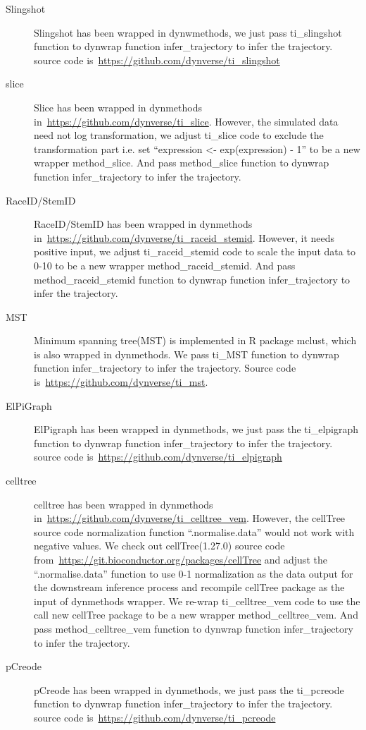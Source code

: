 \begin{description}
	\item[Slingshot]
	Slingshot has been wrapped in dynwmethods, we just pass ti\_slingshot function to dynwrap function infer\_trajectory to infer the trajectory. source code is~\url{https://github.com/dynverse/ti\_slingshot}

	\item[slice]
	Slice has been wrapped in dynmethods in~\url{https://github.com/dynverse/ti\_slice}. However, the simulated data need not log transformation, we adjust ti\_slice code to exclude the transformation part i.e. set ``expression <- exp(expression) - 1'' to be a new wrapper method\_slice. And pass method\_slice function to dynwrap function infer\_trajectory to infer the trajectory.

	\item[RaceID/StemID]
	RaceID/StemID has been wrapped in dynmethods in~\url{https://github.com/dynverse/ti\_raceid\_stemid}. However, it needs positive input, we adjust ti\_raceid\_stemid code to scale the input data to 0-10 to be a new wrapper method\_raceid\_stemid. And pass method\_raceid\_stemid function to dynwrap function infer\_trajectory to infer the trajectory.

	\item[MST] 
	Minimum spanning tree(MST) is implemented in R package mclust, which is also wrapped in dynmethods. We pass ti\_MST function to dynwrap function infer\_trajectory to infer the trajectory. Source code is~\url{https://github.com/dynverse/ti\_mst}.

	\item[ElPiGraph] 
	ElPigraph has been wrapped in dynmethods, we just pass the ti\_elpigraph function to dynwrap function infer\_trajectory to infer the trajectory. source code is~\url{https://github.com/dynverse/ti_elpigraph}

	\item[celltree] 
	celltree has been wrapped in dynmethods in~\url{https://github.com/dynverse/ti\_celltree\_vem}. However, the cellTree source code normalization function ``.normalise.data'' would not work with negative values. We check out cellTree(1.27.0) source code from~\url{https://git.bioconductor.org/packages/cellTree} and adjust the ``.normalise.data'' function to use 0-1 normalization as the data output for the downstream inference process and recompile cellTree package as the input of dynmethods wrapper. We re-wrap ti\_celltree\_vem code to use the call new cellTree package to be a new wrapper method\_celltree\_vem. And pass method\_celltree\_vem function to dynwrap function infer\_trajectory to infer the trajectory.

	\item[pCreode] 
	pCreode has been wrapped in dynmethods, we just pass the ti\_pcreode function to dynwrap function infer\_trajectory to infer the trajectory. source code is~\url{https://github.com/dynverse/ti\_pcreode}
\end{description}


